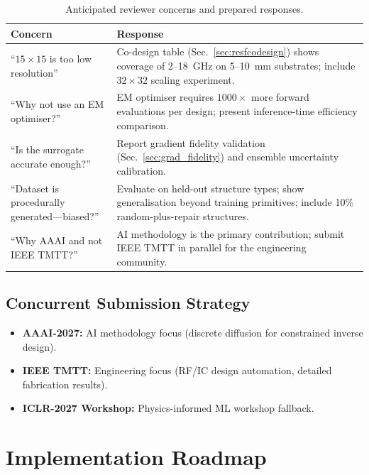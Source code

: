\documentclass[12pt,a4paper]{article}
\theoremstyle{definition}
\theoremstyle{plain}
\theoremstyle{remark}
\begin{document}
\begin{table}[H]
\centering
\caption{Anticipated reviewer concerns and prepared responses.}
\label{tab:reviewer}
\begin{tabularx}{\linewidth}{lX}
\toprule
\textbf{Concern} & \textbf{Response} \\
\midrule
``$15\times15$ is too low resolution''
  & Co-design table (Sec.~\ref{sec:resfcodesign}) shows coverage of
    2--18~GHz on 5--10~mm substrates; include $32\times32$ scaling experiment. \\
``Why not use an EM optimiser?''
  & EM optimiser requires $1000\times$ more forward evaluations per design;
    present inference-time efficiency comparison. \\
``Is the surrogate accurate enough?''
  & Report gradient fidelity validation (Sec.~\ref{sec:grad_fidelity})
    and ensemble uncertainty calibration. \\
``Dataset is procedurally generated---biased?''
  & Evaluate on held-out structure types; show generalisation beyond
    training primitives; include 10\% random-plus-repair structures. \\
``Why AAAI and not IEEE TMTT?''
  & AI methodology is the primary contribution; submit IEEE TMTT in parallel for
    the engineering community. \\
\bottomrule
\end{tabularx}
\end{table}

\subsection{Concurrent Submission Strategy}

\begin{itemize}
  \item \textbf{AAAI-2027:} AI methodology focus (discrete diffusion for constrained
        inverse design).
  \item \textbf{IEEE TMTT:} Engineering focus (RF/IC design automation, detailed
        fabrication results).
  \item \textbf{ICLR-2027 Workshop:} Physics-informed ML workshop fallback.
\end{itemize}

\section{Implementation Roadmap}
\label{sec:roadmap}
\end{document}
